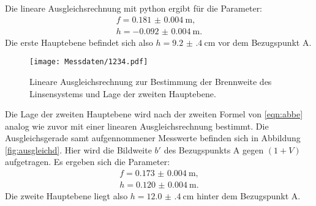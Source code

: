Die lineare Ausgleichsrechnung mit python ergibt für die Parameter:
\begin{gather*}
	f = \SI{0.181(4)}{\meter} \text{,} \\
	h = -\SI{0.092(4)}{\meter} \text{.}
\end{gather*}
Die erste Hauptebene befindet sich also $h=\SI{9.2(4)}{\centi\meter}$ vor dem Bezugspunkt A.

\begin{figure}
  \centering
  \texttt{[image: Messdaten/1234.pdf]}
  \caption{Lineare Ausgleichsrechnung zur Bestimmung der Brennweite des Linsensystems und Lage der zweiten Hauptebene.}
  \label{fig:ausgleichd2}
\end{figure}



Die Lage der zweiten Hauptebene wird nach der zweiten Formel von \eqref{eqn:abbe} analog wie
zuvor mit einer linearen Ausgleichsrechnung bestimmt.
Die Ausgleichsgerade samt aufgennommener Messwerte befinden sich in Abbildung \ref{fig:ausgleichd}. Hier wird die Bildweite $b'$ des Bezugspunkts A gegen $(1+V)$ aufgetragen.
Es ergeben sich die Parameter:
\begin{gather*}
	f = \SI{0.173(4)}{\meter} \text{,}  \\
	h = \SI{0.120(4)}{\meter} \text{.}
\end{gather*}
Die zweite Hauptebene liegt also $h=\SI{12.0(4)}{\centi\meter}$ hinter dem Bezugspunkt A.
